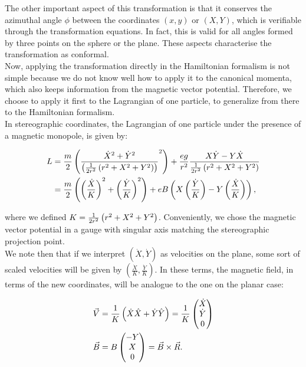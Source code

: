 The other important aspect of this transformation is that it conserves the azimuthal angle $\phi$ between the coordinates $(x,y)$ or $(X,Y)$, which is verifiable through the transformation equations. In fact, this is valid for all angles formed by three points on the sphere or the plane. These aspects characterise the transformation as conformal.\\

Now, applying the transformation directly in the Hamiltonian formalism is not simple because we do not know well how to apply it to the canonical momenta, which also keeps information from the magnetic vector potential. Therefore, we choose to apply it first to the Lagrangian of one particle, to generalize from there to the Hamiltonian formalism.\\

In stereographic coordinates, the Lagrangian of one particle under the presence of a magnetic monopole, is given by:

\begin{align}
L &= \frac{m}{2}\left( \frac{\dot{X}^2+\dot{Y}^2}{\left( \frac{1}{2r^2}\left( r^2+X^2+Y^2 \right) \right)}^2 \right) + \frac{eg}{r^2}\frac{X\dot{Y}-Y\dot{X}}{\frac{1}{2r^2}\left( r^2+X^2+Y^2 \right)} \nonumber \\
&= \frac{m}{2}\left( \left( \frac{\dot{X}}{K} \right)^2+\left( \frac{\dot{Y}}{K} \right)^2 \right) + eB\left( X\left( \frac{\dot{Y}}{K} \right)-Y\left( \frac{\dot{X}}{K} \right) \right),
\end{align}

where we defined $K=\frac{1}{2r^2}\left( r^2+X^2+Y^2 \right)$. Conveniently, we chose the magnetic vector potential in a gauge with singular axis matching the stereographic projection point.\\

We note then that if we interpret $(\dot{X},\dot{Y})$ as velocities on the plane, some sort of scaled velocities will be given by $(\frac{\dot{X}}{K},\frac{\dot{Y}}{K})$. In these terms, the magnetic field, in terms of the new coordinates, will be analogue to the one on the planar case:

\begin{align*}
\vec{V} &= \frac{1}{K}\left( \dot{X}\hat{X} + \dot{Y}\hat{Y} \right) = \frac{1}{K}\begin{pmatrix} \dot{X} \\ \dot{Y}\\0 \end{pmatrix} \\
\vec{B} &= B\begin{pmatrix} -Y \\ X \\ 0 \end{pmatrix} = \vec{B}\times \vec{R} .
\end{align*}

